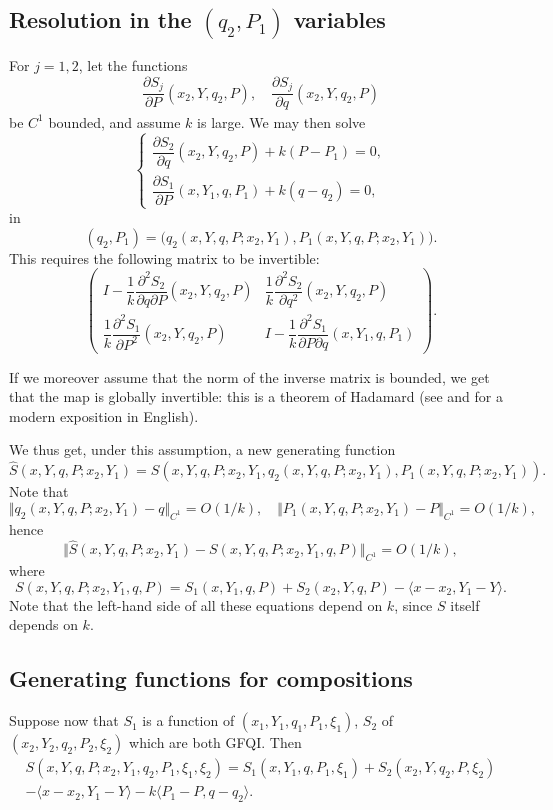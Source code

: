 \documentclass[JEP,XML,SOM,NoFloatCountersInSection,Unicode,published]{cedram}
\numberwithin{equation}{section}
\newcommand{\GFQI}{\textup{GFQI}\xspace}
\theoremstyle{plain}
\theoremstyle{definition}
\theoremstyle{remark}
\begin{document}
\subsection{Resolution in the \texorpdfstring{$(q_{2},P_{1})$}{(q2,p1)} variables}

For $j=1,2$, let the functions
\[
\frac{\partial S_{j}}{\partial P_{}}(x_{2},Y,q_{2},P), \quad \frac{\partial S_{j}}{\partial q_{}}(x_{2},Y,q_{2},P)
\]
be $C^1$ bounded, and assume $k$ is large. We may then solve
\[
\begin{cases}
\dfrac{\partial S_{2}}{\partial q}(x_{2},Y,q_{2},P)+k(P-P_{1})=0, \\[8pt]
\dfrac{\partial S_{1}}{\partial P}(x,Y_{1},q,P_{1})+k (q-q_{2})=0,
\end{cases}
\]
in
\[
(q_2,P_1)= \bigl (q_2(x,Y,q,P; x_2,Y_1), P_1(x,Y,q,P; x_2,Y_1) \bigr).
\]
This requires the following matrix to be invertible:
\[
\begin{pmatrix}
I- \dfrac{1}{k} \dfrac{\partial^2 S_{2}}{\partial q\partial P}(x_{2},Y,q_{2},P) & \dfrac{1}{k} \dfrac{\partial^2 S_{2}}{\partial q^2}(x_{2},Y,q_{2},P) \\[8pt]
\dfrac{1}{k} \dfrac{\partial^2 S_{1}}{\partial P^{2}}(x_{2},Y,q_{2},P) & I- \dfrac{1}{k} \dfrac{\partial^{2}S_{1}}{\partial P\partial q}(x,Y_{1},q,P_{1})
\end{pmatrix}.
\]

If we moreover assume that the norm of the inverse matrix is bounded, we get that the map is globally invertible: this is a theorem of Hadamard (see \cite{Hadamard} and \cite{DM-G-Z} for a modern exposition in English).

We thus get, under this assumption, a new generating function
\[
{\widehat S}(x,Y,q,P; x_2,Y_1)= S(x,Y,q,P; x_2,Y_1, q_2(x,Y,q,P; x_2,Y_1), P_1(x,Y,q,P; x_2,Y_1)).
\]
Note that
\[
\Vert q_2(x,Y,q,P; x_2,Y_1)-q \Vert_{C^1} =O(1/k),\quad \Vert P_1(x,Y,q,P; x_2,Y_1)-P \Vert_{C^1} = O(1/k),
\]
hence
\[
\Vert \widehat S(x,Y,q,P; x_2,Y_1) -S (x,Y,q,P; x_2,Y_1,q,P) \Vert_{C^1} = O(1/k),
\]
where
\[
S (x,Y,q,P; x_2,Y_1,q,P)=S_{1}(x,Y_{1},q,P)+ S_{2}(x_{2},Y,q,P)- \langle x-x_{2},Y_{1}-Y \rangle.
\]
Note that the left-hand side of all these equations depend on $k$, since $S$ itself depends on $k$.

\subsection{Generating functions for compositions}

Suppose now that $S_{1}$ is a function of $(x_{1},Y_{1},q_{1},P_{1}, \xi_{1})$, $S_{2}$ of
$(x_{2},Y_{2},q_{2},P_{2}, \xi_{2})$ which are both \GFQI.
Then
\begin{multline*}
S(x,Y,q,P; x_{2},Y_{1},q_{2},P_{1}, \xi_{1}, \xi_{2})=S_{1}(x,Y_{1},q,P_{1},\xi_{1})+ S_{2}(x_{2},Y,q_{2},P,\xi_{2})
\\ -\langle x-x_{2},Y_{1}-Y \rangle - k \langle P_{1}-P,q-q_{2} \rangle.
\end{multline*}
\end{document}
